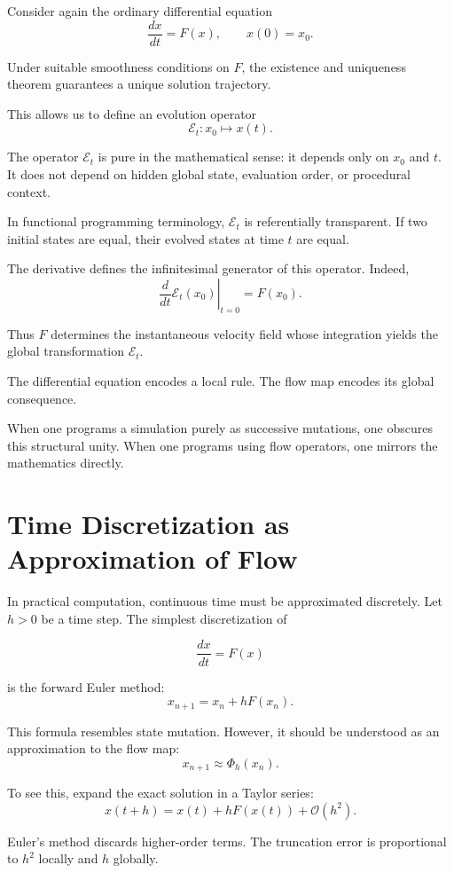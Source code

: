 \documentclass[12pt]{book}
\begin{document}
Consider again the ordinary differential equation
\[
\frac{dx}{dt} = F(x),
\qquad x(0) = x_0.
\]

Under suitable smoothness conditions on $F$, the existence and uniqueness theorem guarantees a unique solution trajectory.

This allows us to define an evolution operator
\[
\mathcal{E}_t : x_0 \mapsto x(t).
\]

The operator $\mathcal{E}_t$ is pure in the mathematical sense: it depends only on $x_0$ and $t$. It does not depend on hidden global state, evaluation order, or procedural context.

In functional programming terminology, $\mathcal{E}_t$ is referentially transparent. If two initial states are equal, their evolved states at time $t$ are equal.

The derivative defines the infinitesimal generator of this operator. Indeed,
\[
\left. \frac{d}{dt} \mathcal{E}_t(x_0) \right|_{t=0}
=
F(x_0).
\]

Thus $F$ determines the instantaneous velocity field whose integration yields the global transformation $\mathcal{E}_t$.

The differential equation encodes a local rule. The flow map encodes its global consequence.

When one programs a simulation purely as successive mutations, one obscures this structural unity. When one programs using flow operators, one mirrors the mathematics directly.

\section{Time Discretization as Approximation of Flow}

In practical computation, continuous time must be approximated discretely. Let $h > 0$ be a time step. The simplest discretization of

\[
\frac{dx}{dt} = F(x)
\]

is the forward Euler method:
\[
x_{n+1} = x_n + h F(x_n).
\]

This formula resembles state mutation. However, it should be understood as an approximation to the flow map:
\[
x_{n+1} \approx \Phi_h(x_n).
\]

To see this, expand the exact solution in a Taylor series:
\[
x(t+h) = x(t) + h F(x(t)) + \mathcal{O}(h^2).
\]

Euler's method discards higher-order terms. The truncation error is proportional to $h^2$ locally and $h$ globally.
\end{document}
